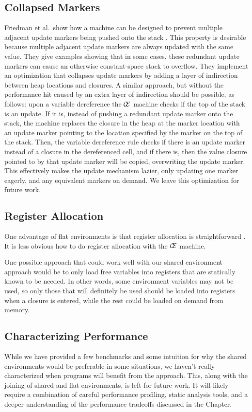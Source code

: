 \subsection{Collapsed Markers}
Friedman et al.\ show how a machine can be designed to prevent multiple adjacent
update markers being pushed onto the stack \cite{lkm}.  This property is
desirable because multiple adjacent update markers are always updated with the
same value. They give examples showing that in some cases, these redundant
update markers can cause an otherwise constant-space stack to overflow.  They
implement an optimization that collapses update markers by adding a layer of
indirection between heap locations and closures. A similar approach,
but without the performance hit caused by an extra layer of indirection should
be possible, as follows: upon a variable dereference the $\mathcal{\mathcal{C}
\mskip -4mu \mathcal{E}}$ machine checks if the top of the stack is an update.
If it is, instead of pushing a redundant update marker onto the stack, the
machine replaces the closure in the heap at the marker location with an update
marker pointing to the location specified by the marker on the top of the stack.
Then, the variable dereference rule checks if there is an update marker instead
of a closure in the dereferenced cell, and if there is, then the value closure
pointed to by that update marker will be copied, overwriting the update marker.
This effectively makes the update mechanism lazier, only updating one marker
eagerly, and any equivalent markers on demand.  We leave this optimization for
future work.

\subsection{Register Allocation} \label{sec:alloc}
One advantage of flat environments is that register allocation is
straightforward \cite{appel1992compiling,jonesstg,terei2010llvm}. It is less
obvious how to do register allocation with the $\mathcal{\mathcal{C} \mskip
-4mu \mathcal{E}}$ machine.  

One possible approach that could work well with our shared environment approach
would be to only load free variables into registers that are statically known to
be needed. In other words, some environment variables may not be used, so only
those that will definitely be used should be loaded into registers when a
closure is entered, while the rest could be loaded on demand from memory.

\subsection{Characterizing Performance}
While we have provided a few benchmarks and some intuition for why the shared
environments would be preferable in some situations, we haven't really
characterized when programs will benefit from the approach.  This, along with
the joining of shared and flat environments, is left for future work. It will
likely require a combination of careful performance profiling, static analysis
tools, and a deeper understanding of the performance tradeoffs discussed in the
Chapter.

